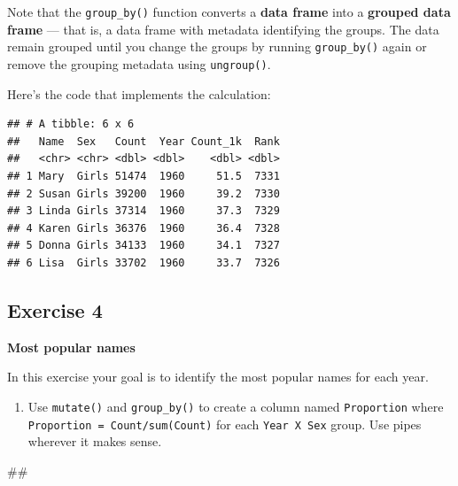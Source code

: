 \documentclass[]{book}
\newenvironment{Shaded}{\begin{snugshade}}{\end{snugshade}}
\newcommand{\KeywordTok}[1]{\textcolor[rgb]{0.13,0.29,0.53}{\textbf{#1}}}
\newcommand{\DataTypeTok}[1]{\textcolor[rgb]{0.13,0.29,0.53}{#1}}
\newcommand{\StringTok}[1]{\textcolor[rgb]{0.31,0.60,0.02}{#1}}
\newcommand{\OperatorTok}[1]{\textcolor[rgb]{0.81,0.36,0.00}{\textbf{#1}}}
\newcommand{\NormalTok}[1]{#1}
\providecommand{\tightlist}{%
  \setlength{\itemsep}{0pt}\setlength{\parskip}{0pt}}
\begin{document}
Note that the \texttt{group\_by()} function converts a \textbf{data
frame} into a \textbf{grouped data frame} --- that is, a data frame with
metadata identifying the groups. The data remain grouped until you
change the groups by running \texttt{group\_by()} again or remove the
grouping metadata using \texttt{ungroup()}.

Here's the code that implements the calculation:

\begin{Shaded}
\end{Shaded}

\begin{verbatim}
## # A tibble: 6 x 6
##   Name  Sex   Count  Year Count_1k  Rank
##   <chr> <chr> <dbl> <dbl>    <dbl> <dbl>
## 1 Mary  Girls 51474  1960     51.5  7331
## 2 Susan Girls 39200  1960     39.2  7330
## 3 Linda Girls 37314  1960     37.3  7329
## 4 Karen Girls 36376  1960     36.4  7328
## 5 Donna Girls 34133  1960     34.1  7327
## 6 Lisa  Girls 33702  1960     33.7  7326
\end{verbatim}

\subsection{Exercise 4}\label{exercise-4}

\textbf{Most popular names}

In this exercise your goal is to identify the most popular names for
each year.

\begin{enumerate}
\def\labelenumi{\arabic{enumi}.}
\tightlist
\item
  Use \texttt{mutate()} and \texttt{group\_by()} to create a column
  named \texttt{Proportion} where
  \texttt{Proportion\ =\ Count/sum(Count)} for each
  \texttt{Year\ X\ Sex} group. Use pipes wherever it makes sense.
\end{enumerate}

\begin{Shaded}
\begin{Highlighting}[]
\NormalTok{## }
\end{Highlighting}
\end{Shaded}
\end{document}
